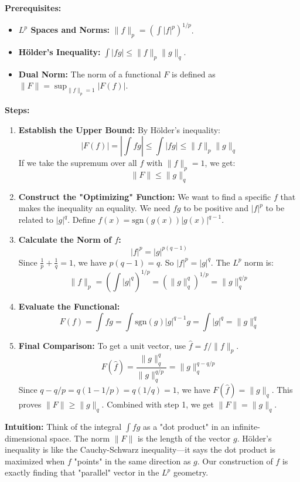 \begin{solution}
\textbf{Prerequisites:}
\begin{itemize}
    \item \textbf{$L^p$ Spaces and Norms:} $\|f\|_p = (\int |f|^p)^{1/p}$.
    \item \textbf{H\"older's Inequality:} $\int |fg| \leq \|f\|_p \|g\|_q$.
    \item \textbf{Dual Norm:} The norm of a functional $F$ is defined as $\|F\| = \sup_{\|f\|_p=1} |F(f)|$.
\end{itemize}

\bigskip

\textbf{Steps:}
\begin{enumerate}
    \item \textbf{Establish the Upper Bound:} By H\"older's inequality:
    \[ |F(f)| = \left| \int fg \right| \leq \int |fg| \leq \|f\|_p \|g\|_q \]
    If we take the supremum over all $f$ with $\|f\|_p=1$, we get:
    \[ \|F\| \leq \|g\|_q \]

    \item \textbf{Construct the "Optimizing" Function:} We want to find a specific $f$ that makes the inequality an equality. We need $fg$ to be positive and $|f|^p$ to be related to $|g|^q$.
    Define $f(x) = \text{sgn}(g(x)) |g(x)|^{q-1}$. 
    
    \item \textbf{Calculate the Norm of $f$:}
    \[ |f|^p = |g|^{p(q-1)} \]
    Since $\frac{1}{p} + \frac{1}{q} = 1$, we have $p(q-1) = q$. So $|f|^p = |g|^q$.
    The $L^p$ norm is:
    \[ \|f\|_p = \left( \int |g|^q \right)^{1/p} = (\|g\|_q^q)^{1/p} = \|g\|_q^{q/p} \]

    \item \textbf{Evaluate the Functional:}
    \[ F(f) = \int f g = \int \text{sgn}(g) |g|^{q-1} g = \int |g|^q = \|g\|_q^q \]
    
    \item \textbf{Final Comparison:} To get a unit vector, use $\hat{f} = f / \|f\|_p$.
    \[ F(\hat{f}) = \frac{\|g\|_q^q}{\|g\|_q^{q/p}} = \|g\|_q^{q - q/p} \]
    Since $q - q/p = q(1-1/p) = q(1/q) = 1$, we have $F(\hat{f}) = \|g\|_q$.
    This proves $\|F\| \geq \|g\|_q$. Combined with step 1, we get $\|F\| = \|g\|_q$.
\end{enumerate}

\bigskip

\textbf{Intuition:} 
Think of the integral $\int fg$ as a "dot product" in an infinite-dimensional space. The norm $\|F\|$ is the length of the vector $g$. H\"older's inequality is like the Cauchy-Schwarz inequality—it says the dot product is maximized when $f$ "points" in the same direction as $g$. Our construction of $f$ is exactly finding that "parallel" vector in the $L^p$ geometry.
\end{solution}

